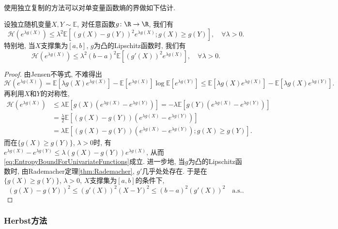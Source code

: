 使用独立复制的方法可以对单变量函数熵的界做如下估计. 
\begin{lemma}[单变量函数熵的界]\label{lemma:EntropyBoundForUnivariateFunctions}
	设独立随机变量$X, Y \sim \mathbb{E}$, 对任意函数$g \colon \R \to \R$, 我们有
	\begin{equation}\label{eq:EntropyBoundForUnivariateFunctions}
		\mathcal{H}(e^{\lambda g(X)})
		\leq \lambda^2 \mathbb{E}[ (g(X) - g(Y))^2 e^{\lambda g(X)}; g(X) \geq g(Y) ], \quad \forall \lambda > 0.
	\end{equation}
	特别地, 当$X$支撑集为$[a, b]$, $g$为凸的Lipschitz函数时, 我们有
	\begin{equation*}
		\mathcal{H}(e^{\lambda g(X)}) 
		\leq \lambda^2 (b-a)^2 \mathbb{E}[(g'(X))^2 e^{\lambda g(X)}], \quad \forall \lambda > 0.
	\end{equation*}
\end{lemma}
\begin{proof}
	由Jensen不等式, 不难得出
	\begin{equation*}
		\mathcal{H}(e^{\lambda g(X)})
		= \mathbb{E}[\lambda g(X) e^{\lambda g(X)}] - \mathbb{E}[e^{\lambda g(X)}] \log \mathbb{E}[e^{\lambda g(Y)}] 
		\leq \mathbb{E}[\lambda g(X) e^{\lambda g(X)}] - \mathbb{E}[\lambda g(X) e^{\lambda g(Y)}].
	\end{equation*}
	再利用$X$和$Y$的对称性, 
	\begin{align*}
		\mathcal{H}(e^{\lambda g(X)})
		&\leq \lambda \mathbb{E}[ g(X) (e^{\lambda g(X)}-  e^{\lambda g(Y)})] 
		= - \lambda \mathbb{E}[ g(Y) (e^{\lambda g(X)}-  e^{\lambda g(Y)})] \\
		&= \frac{\lambda}{2} \mathbb{E}\left[(g(X) - g(Y)) (e^{\lambda g(X)} - e^{\lambda g(Y)})\right] \\
		&= \lambda \mathbb{E}\left[(g(X) - g(Y)) (e^{\lambda g(X)} - e^{\lambda g(Y)}); g(X) \geq g(Y) \right].
	\end{align*}
	而在$\{g(X) \geq g(Y)\}$, $\lambda > 0$时, 有$e^{\lambda g(X)} - e^{\lambda g(Y)} \leq \lambda(g(X) - g(Y)) e^{\lambda g(X)}$, 从而\eqref{eq:EntropyBoundForUnivariateFunctions}成立. 
	进一步地, 当$g$为凸的Lipschitz函数时, 由Rademacher定理\ref{thm:Rademacher}, $g'$几乎处处存在. 
	于是在$\{g(X) \geq g(Y)\}$, $\lambda > 0$, $X$支撑集为$[a, b]$的条件下,
	\begin{equation*}
		(g(X) - g(Y))^2 \leq (g'(X))^2 (X-Y)^2 \leq (b-a)^2 (g'(X))^2 \quad \text{a.s.}.
	\end{equation*}
\end{proof}

\subsubsection{Herbst方法}

